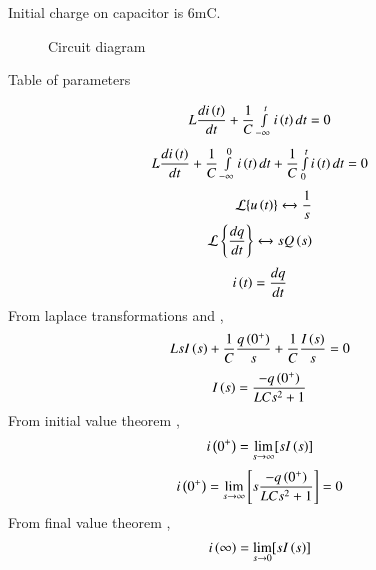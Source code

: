\documentclass[beamer]{IEEEtran}
\theoremstyle{remark}
\begin{document}
     Initial charge on capacitor is 6mC.
     \begin{figure}[h]


  
    

    



  
  
       
  
    \caption{Circuit diagram}
     
   \label{fig:12.7.8.1}
\end{figure}
\begin{table}[h]
  \centering
  
  \caption{Table of parameters}
  \label{tab:12.7.8.1}
\end{table}
\begin{align}
    L\frac{di\left(t\right)}{dt}+\frac{1}{C}\smallint_{-\infty}^{t}i\left(t\right)dt=0
\end{align}
\begin{align}
      L\frac{di\left(t\right)}{dt}+\frac{1}{C}\smallint_{-\infty}^{0}i\left(t\right)dt+\frac{1}{C}\smallint_{0}^{t}i\left(t\right)dt=0
\end{align}
\begin{gather}
\begin{align}
\mathcal{L}\{u\left(t\right)\} \xleftrightarrow{} \frac{1}{s}\\
\mathcal{L} \left\{\frac{dq}{dt}\right\}\xleftrightarrow{} sQ\left(s\right)
\end{align}
\end{gather}
\begin{align}
 i\left(t\right)=\frac{dq}{dt}
\end{align}
From laplace transformations  and ,
\begin{align}
    L{sI\left(s\right)}+\frac{1}{C}\frac{q\left(0^{+}\right)}{s}+\frac{1}{C}\frac{I\left(s\right)}{s}=0
\end{align}
\begin{align}
    I\left(s\right)= \frac{-q\left(0^{+}\right)}{LCs^2+1}
\end{align}
From initial value theorem ,
\begin{align}
    i\left(0^{+}\right)=\lim_{s\to\infty}[sI\left(s\right)]
\end{align}
\begin{align}
    i\left(0^{+}\right)=\lim_{s\to\infty}\left[s\frac{-q\left(0^{+}\right)}{LCs^2+1}\right]=0
\end{align}
From final value theorem ,
\begin{align}
     i\left(\infty\right)=\lim_{s\to0}[sI\left(s\right)]
\end{align}
\end{document}
